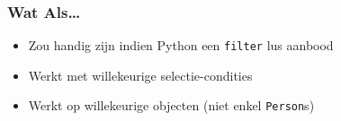 \begin{frame}
  \frametitle{Wat Als\dots}
  \begin{itemize}
    \item Zou handig zijn indien Python een {\tt filter} lus aanbood
  \end{itemize}
  \begin{itemize}
    \item Werkt met willekeurige selectie-condities
    \item Werkt op willekeurige objecten (niet enkel \texttt{Person}s)
  \end{itemize}
\end{frame}


